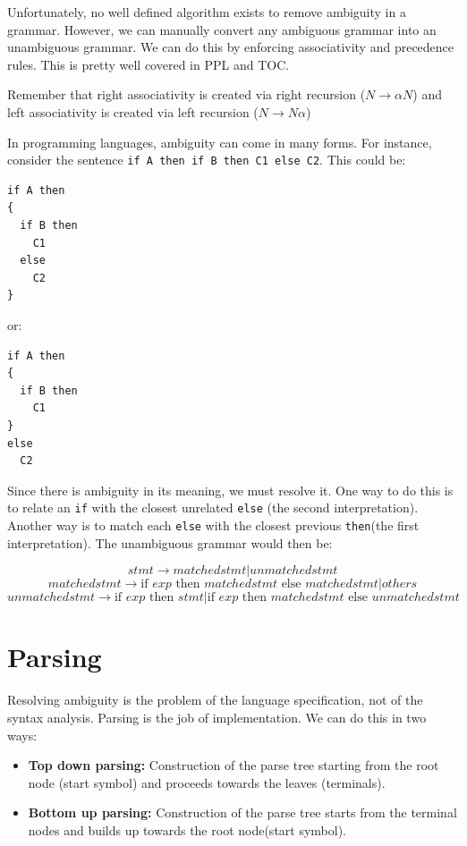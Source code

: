 \documentclass[12pt,letterpaper]{amsbook}
\theoremstyle{definition}
\begin{document}
Unfortunately, no well defined algorithm exists to remove ambiguity in a grammar. However, we can manually convert any ambiguous grammar into an unambiguous grammar. We can do this by enforcing associativity and precedence rules. This is pretty well covered in PPL and TOC.

Remember that right associativity is created via right recursion ($N \rightarrow \alpha N$) and left associativity is created via left recursion ($N \rightarrow N \alpha$)

In programming languages, ambiguity can come in many forms. For instance, consider the sentence \texttt{if A then if B then C1 else C2}.  This could be:

\begin{verbatim}
if A then 
{
  if B then
    C1
  else
    C2
}
\end{verbatim}

or:

\begin{verbatim}
if A then 
{
  if B then
    C1
}
else
  C2
\end{verbatim}

Since there is ambiguity in its meaning, we must resolve it. One way to do this is to relate an \texttt{if} with the closest unrelated \texttt{else} (the second interpretation). Another way is to match each \texttt{else} with the closest previous \texttt{then}(the first interpretation). The unambiguous grammar would then be:

\[stmt \rightarrow matchedstmt | unmatchedstmt\]
\[matchedstmt \rightarrow \text{if }exp \text{ then } matchedstmt \text{ else } matchedstmt | others\]
\[unmatchedstmt \rightarrow \text{if }exp \text{ then } stmt | \text{if }exp \text{ then } matchedstmt \text{ else } unmatchedstmt\]

\section{Parsing}

Resolving ambiguity is the problem of the language specification, not of the syntax analysis. Parsing is the job of implementation. We can do this in two ways:

\begin{itemize}
  \item \textbf{Top down parsing:} Construction of the parse tree starting from the root node (start symbol) and proceeds towards the leaves (terminals).
  \item \textbf{Bottom up parsing:} Construction of the parse tree starts from the terminal nodes and builds up towards the root node(start symbol).
\end{itemize}
\end{document}
